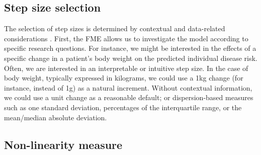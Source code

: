 \subsection{Step size selection}

The selection of step sizes is determined by contextual and data-related considerations \citep{scholbeck_fme}. First, the FME allows us to investigate the model according to specific research questions. For instance, we might be interested in the effects of a specific change in a patient's body weight on the predicted individual disease risk. Often, we are interested in an interpretable or intuitive step size. In the case of body weight, typically expressed in kilograms, we could use a 1kg change (for instance, instead of 1g) as a natural increment. Without contextual information, we could use a unit change as a reasonable default; or dispersion-based measures such as one standard deviation, percentages of the interquartile range, or the mean/median absolute deviation.

\subsection{Non-linearity measure}

